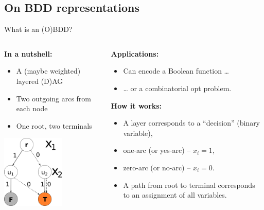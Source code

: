 \documentclass[10pt, xcolor=svgnames]{beamer}
\begin{document}
\subsection{On BDD representations}
\label{sec:org0ad9108}
\begin{frame}[label={sec:orgd8a60f1}]{What is an (O)BDD?}
\begin{columns}
\begin{column}[t]{0.40\columnwidth}
\textbf{In a nutshell:}
\begin{itemize}
\item A (maybe weighted) layered (D)AG
\item Two outgoing arcs from each node
\item One root, two terminals\vspace{2ex}
\end{itemize}

\includegraphics[width=0.6\textwidth]{./img/simple-BDD.png}
\end{column}
\begin{column}[t]{0.5\columnwidth}
\textbf{Applications:}
\begin{itemize}
\item Can encode a Boolean function \ldots{}
\item \ldots{} or a combinatorial opt problem.
\end{itemize}

\textbf{How it works:}
\begin{itemize}
\item A layer corresponds to a ``decision'' (binary variable),
\item \alert{one-arc} (or yes-arc) -- \(x_i=1\),
\item \alert{zero-arc} (or no-arc) -- \(x_i=0\).
\item A \alert{path} from root to terminal corresponds to an assignment of all
variables.
\end{itemize}
\end{column}
\end{columns}
\end{frame}
\end{document}
